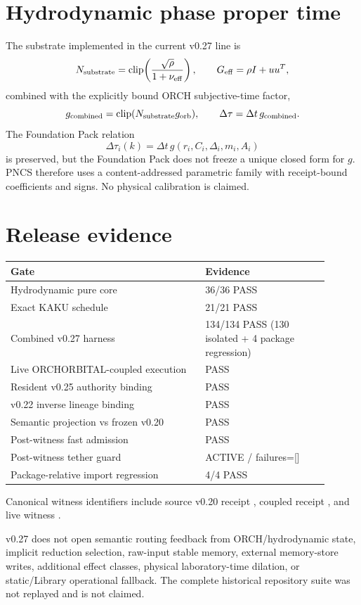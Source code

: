 \section{Hydrodynamic phase proper time}
The substrate implemented in the current v0.27 line is
\[
N_{\rm substrate}=\operatorname{clip}\!\left(\frac{\sqrt\rho}{1+\nu_{\rm eff}}\right),
\qquad
G_{\rm eff}=\rho I+uu^T,
\]
combined with the explicitly bound ORCH subjective-time factor,
\[
g_{\rm combined}=\operatorname{clip}(N_{\rm substrate}g_{\rm orb}),
\qquad
\Delta\tau=\Delta t\,g_{\rm combined}.
\]
The Foundation Pack relation
\[
\Delta\tau_i(k)=\Delta t\,g(r_i,C_i,\Delta_i,m_i,A_i)
\]
is preserved, but the Foundation Pack does not freeze a unique closed form for \(g\). PNCS therefore uses a content-addressed parametric family with receipt-bound coefficients and signs. No physical calibration is claimed.

\section{Release evidence}
\begin{longtable}{p{0.55\linewidth}p{0.35\linewidth}}
\toprule
Gate & Evidence\\\midrule
Hydrodynamic pure core & 36/36 PASS\\
Exact KAKU schedule & 21/21 PASS\\
Combined v0.27 harness & 134/134 PASS (130 isolated + 4 package regression)\\
Live ORCHORBITAL-coupled execution & PASS\\
Resident v0.25 authority binding & PASS\\
v0.22 inverse lineage binding & PASS\\
Semantic projection vs frozen v0.20 & PASS\\
Post-witness fast admission & PASS\\
Post-witness tether guard & ACTIVE / failures=[]\\
Package-relative import regression & 4/4 PASS\\\bottomrule
\end{longtable}

Canonical witness identifiers include source v0.20 receipt
, coupled receipt
, and live witness
.

\begin{boundarybox}
v0.27 does not open semantic routing feedback from ORCH/hydrodynamic state, implicit reduction selection, raw-input stable memory, external memory-store writes, additional effect classes, physical laboratory-time dilation, or static/Library operational fallback. The complete historical repository suite was not replayed and is not claimed.
\end{boundarybox}

